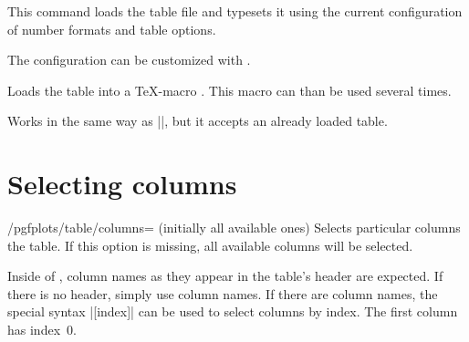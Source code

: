 \begin{command}{}
	This command loads the table file  and typesets it using the current configuration of number formats and table options.
\begin{codeexample}[]
\end{codeexample}

	\noindent The configuration can be customized with .

\begin{codeexample}[]
\end{codeexample}
\end{command}

\begin{command}{\pgfplotstableread{}}
	Loads the table  into a \TeX-macro . This macro can than be used several times.
\begin{codeexample}[]
\table
\pgfplotstabletypeset[columns={dof,error1}]\table
\hspace{2cm}
\pgfplotstabletypeset[columns={dof,error2}]\table
\end{codeexample}
\end{command}

\begin{command}{}
	Works in the same way as |\pgfplotstabletypesetfile|, but it accepts an already loaded table.
\end{command}

\section{Selecting columns}
\begin{key}{/pgfplots/table/columns= (initially all available ones)}
	Selects particular columns the table. If this option is missing, all available columns will be selected.

	Inside of , column names as they appear in the table's header are expected. If there is no header, simply use column names. If there are column names, the special syntax |[index]| can be used to select columns by index. The first column has index~$0$.
\begin{codeexample}[]
\end{codeexample}
\end{key}

